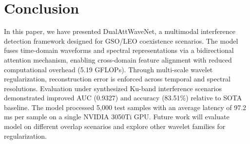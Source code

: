 \documentclass[10pt, conference]{IEEEtran}
\begin{document}


\section{Conclusion}

In this paper, we have presented DualAttWaveNet, a multimodal interference detection framework designed for GSO/LEO coexistence scenarios. The model fuses time-domain waveforms and spectral representations via a bidirectional attention mechanism, enabling cross-domain feature alignment with reduced computational overhead (5.19 GFLOPs). Through multi-scale wavelet regularization, reconstruction error is enforced across temporal and spectral resolutions. Evaluation under synthesized Ku-band interference scenarios demonstrated improved AUC (0.9327) and accuracy (83.51\%) relative to SOTA baseline. The model processed 5,000 test samples with an average latency of 97.2 ms per sample on a single NVIDIA 3050Ti GPU. Future work will evaluate model on different overlap scenarios and explore other wavelet families for regularization.



\end{document}
